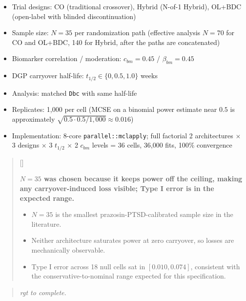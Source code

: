 \documentclass[
  11pt,
]{article}
\newcounter{pgraph}
\newenvironment{bullets}{%
  \stepcounter{pgraph}%
  \begin{quote}\small\sffamily\color[gray]{0.30}%
  {\normalfont\scriptsize\color[gray]{0.58}[\thepgraph]\enspace}}{%
  \end{quote}}
\newenvironment{rgt}{%
  \begin{quote}\small\itshape\color[RGB]{20,60,160}}{%
  \end{quote}}
\begin{document}
\begin{itemize}
\item Trial designs: CO (traditional crossover), Hybrid (N-of-1
  Hybrid), OL+BDC (open-label with blinded discontinuation)
\item Sample size: $N = 35$ per randomization path (effective
  analysis $N = 70$ for CO and OL+BDC, 140 for Hybrid, after the
  paths are concatenated)
\item Biomarker correlation / moderation: $c_{bm} = 0.45$ /
  $\beta_{bm} = 0.45$
\item DGP carryover half-life: $t_{1/2} \in \{0, 0.5, 1.0\}$ weeks
\item Analysis: matched \texttt{Dbc} with same half-life
\item Replicates: 1{,}000 per cell (MCSE
  on a binomial power estimate near $0.5$ is approximately
  $\sqrt{0.5 \cdot 0.5 / 1{,}000} \approx 0.016$)
\item Implementation: 8-core \texttt{parallel::mclapply}; full
  factorial 2 architectures $\times$ 3 designs $\times$ 3
  $t_{1/2}$ $\times$ 2 $c_{bm}$ levels = 36 cells, 36{,}000
  fits, 100\% convergence
\end{itemize}

\begin{bullets}

\textbf{$N = 35$ was chosen because it keeps power off the
ceiling, making any carryover-induced loss visible; Type I
error is in the expected range.}

\begin{itemize}\setlength{\itemsep}{2pt}\setlength{\parskip}{0pt}
\item $N = 35$ is the smallest prazosin-PTSD-calibrated sample
  size in the literature.
\item Neither architecture saturates power at zero carryover,
  so losses are mechanically observable.
\item Type I error across 18 null cells sat in
  $[0.010, 0.074]$, consistent with the conservative-to-nominal
  range expected for this specification.
\end{itemize}

\end{bullets}

\begin{rgt}
rgt to complete.

\end{rgt}
\end{document}

